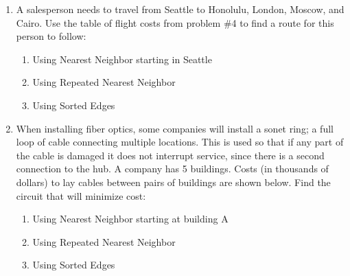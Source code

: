 \begin{enumerate}
\item	A salesperson needs to travel from Seattle to Honolulu, London, Moscow, and Cairo.  Use the table of flight costs from problem \#4 to find a route for this person to follow:
\begin{enumerate}
\item	Using Nearest Neighbor starting in Seattle
\item	Using Repeated Nearest Neighbor
\item	Using Sorted Edges\\
\end{enumerate}

\item	When installing fiber optics, some companies will install a sonet ring; a full loop of cable connecting multiple locations.  This is used so that if any part of the cable is damaged it does not interrupt service, since there is a second connection to the hub.  A company has 5 buildings.  Costs (in thousands of dollars) to lay cables between pairs of buildings are shown below.   Find the circuit that will minimize cost:
\begin{enumerate}
\item	Using Nearest Neighbor starting at building A
\item	Using Repeated Nearest Neighbor
\item	Using Sorted Edges\\
\end{enumerate}

\\




\end{enumerate}
